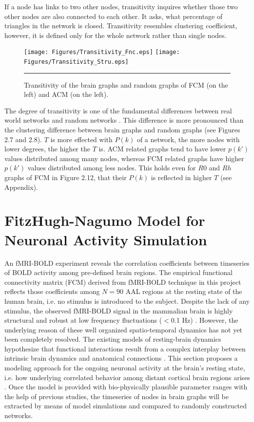 If a node has links to two other nodes, transitivity inquires whether those two other nodes are also connected to each other. It asks, what percentage of triangles in the network is closed. Transitivity resembles clustering coefficient, however, it is defined only for the whole network rather than single nodes. 

\begin{figure}[htbp]
  \centering
	\texttt{[image: Figures/Transitivity\_Fnc.eps]}
	\texttt{[image: Figures/Transitivity\_Stru.eps]} 
    \rule{35em}{0.5pt}
    \caption[Transitivity]{Transitivity of the brain graphs and random graphs of FCM (on the left) and ACM (on the left). }
  \label{fig:Transitivity}
\end{figure}


The degree of transitivity is one of the fundamental differences between real world networks and random networks \citep{NEW10}. This difference is more pronounced than the clustering difference between brain graphs and random graphs (see Figures 2.7 and 2.8). $T$ is more effected with $P(k)$ of a network, the more nodes with lower degrees, the higher the $T$ is. ACM related graphs tend to have lower $p(k')$ values distributed among many nodes, whereas FCM related graphs have higher $p(k')$ values distributed among less nodes. This holds even for $R0$ and $Rh$ graphs of FCM in Figure 2.12, that their $P(k)$ is reflected in higher $T$ (see Appendix).



\section{FitzHugh-Nagumo Model for Neuronal Activity Simulation}

An fMRI-BOLD experiment reveals the correlation coefficients between timeseries of BOLD activity among pre-defined brain regions. The empirical functional connectivity matrix (FCM) derived from fMRI-BOLD technique in this project reflects those coefficients among $N=90$ AAL regions at the resting state of the human brain, i.e. no stimulus is introduced to the subject. Despite the lack of any stimulus, the observed fMRI-BOLD signal in the mammalian brain is highly structural and robust at low frequency fluctuations ($<$0.1 Hz) \citep{BIS95, DAM06, VIN07a}. However, the underlying reason of these well organized spatio-temporal dynamics has not yet been completely resolved. The existing models of resting-brain dynamics hypothesize that functional interactions result from a complex interplay between intrinsic brain dynamics and anatomical connections \citep{RUB09}. This section proposes a modeling approach for the ongoing neuronal activity at the brain's resting state, i.e. how  underlying correlated behavior among distant cortical brain regions arises \citep{VUK13}. Once the model is provided with bio-physically plausible parameter ranges with the help of previous studies, the timeseries of nodes in brain graphs will be extracted by means of model simulations and compared to randomly constructed networks. 

